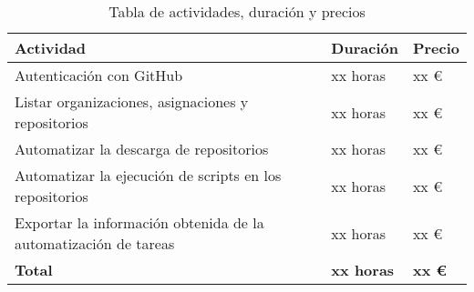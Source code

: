 \begin{table}[!ht]
\begin{center}
\begin{tabular}{|p{80mm}|p{25mm}|p{20mm}|} \hline 
\textbf{Actividad} & \textbf{Duración} & \textbf{Precio} \\ \hline

Autenticación con GitHub &
xx horas &
xx \euro{}
\\
\hline

Listar organizaciones, asignaciones y repositorios &
xx horas &
xx \euro{}
\\
\hline

Automatizar la descarga de repositorios &
xx horas &
xx \euro{}
\\
\hline

Automatizar la ejecución de scripts en los repositorios &
xx horas &
xx \euro{}
\\
\hline

Exportar la información obtenida de la automatización de tareas &
xx horas &
xx \euro{}
\\
\hline \hline

{\bfseries Total} &
{\bfseries xx horas} &
{\bfseries xx \euro{}}
\\
\hline

\end{tabular}
\end{center}
\caption{Tabla de actividades, duración y precios}
\label{table:resOthers}
\end{table}

